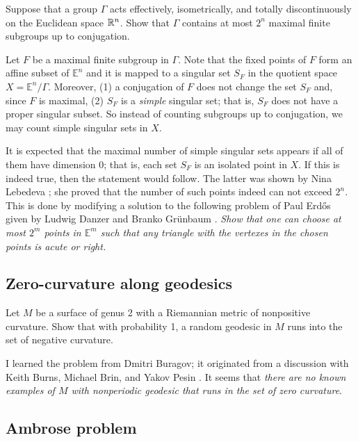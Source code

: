 \begin{pr}
Suppose that a group $\Gamma$ acts effectively, isometrically, and totally discontinuously on the Euclidean space $\mathbb{R}^n$.
Show that $\Gamma$ contains at most $2^n$ maximal finite subgroups up to conjugation.
\end{pr}

Let $F$ be a maximal finite subgroup in $\Gamma$.
Note that the fixed points of $F$ form an affine subset of $\mathbb{E}^n$ and it is mapped to a singular set $S_F$ in the quotient space $X=\mathbb{E}^n/\Gamma$.
Moreover, (1) a conjugation of $F$ does not change the set $S_F$ and, since $F$ is maximal, (2) $S_F$ is a \emph{simple} singular set;
that is, $S_F$ does not have a proper singular subset.
So instead of counting subgroups up to conjugation, we may count simple singular sets in $X$.

It is expected that the maximal number of simple singular sets appears if all of them have dimension 0;
that is, each set $S_F$ is an isolated point in $X$.
If this is indeed true, then the statement would follow.
The latter was shown by  Nina Lebedeva \cite{lebedeva};
she proved that the number of such points indeed can not exceed $2^n$.
This is done by modifying a solution to the following problem of Paul Erdős given by Ludwig Danzer and Branko Gr{\"u}nbaum \cite{danzer-guenbaum}.
\emph{Show that one can choose at most $2^m$ points in $\mathbb{E}^m$ such that any triangle with the vertexes in the chosen points is acute or right.}

\subsection*{Zero-curvature along geodesics}

\begin{pr}
Let $M$ be a surface of genus 2 with a Riemannian metric of nonpositive curvature.
Show that with probability 1, a random geodesic in $M$ runs into the set of negative curvature.
\end{pr}

I learned the problem from 
Dmitri Buragov; it originated from a discussion with Keith Burns, Michael Brin, and Yakov Pesin \cite[see also][]{hertz}.
It seems that \textit{there are no known examples of $M$ with nonperiodic geodesic that runs in the set of zero curvature}.

\subsection*{Ambrose problem}

